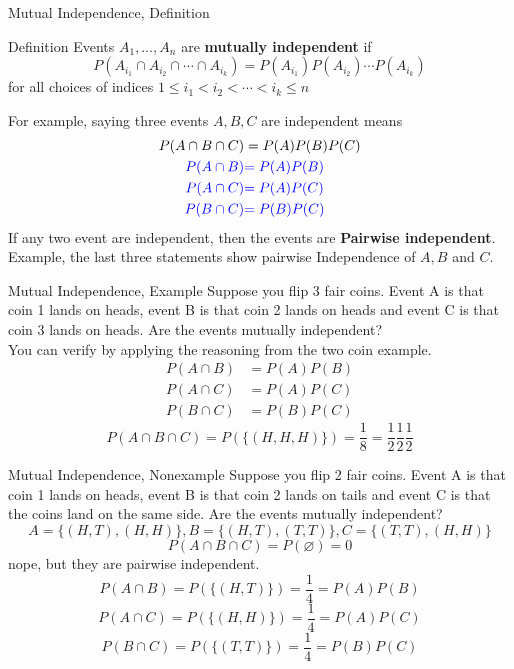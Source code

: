 \documentclass[handout]{beamer}
\newcommand{\blue}[1]{{\color{blue} #1}}
\newcommand{\nl}[1]{\vspace{#1 em}}
\let\emptyset\varnothing
\begin{document}
\begin{frame}{Mutual Independence, Definition}
    \begin{block}{Definition}
        Events $A_1,\dots,A_n$ are \textbf{mutually independent} if
        $$P(A_{i_1} \cap A_{i_2} \cap \cdots \cap A_{i_k}) = P(A_{i_1})P(A_{i_2})\cdots P(A_{i_k})$$
        for all choices of indices $1\leq i_1 < i_2 < \cdots < i_k \leq n$
    \end{block}
        \pause For example, saying three events $A, B, C$ are independent means 
        \begin{align*}
        P(A \cap B \cap C)&=P(A)P(B)P(C) \\
        \blue{P(A \cap B)}&\blue{=P(A)P(B)} \\
        \blue{P(A \cap C)}&\blue{=P(A)P(C)} \\
        \blue{P(B \cap C)}&\blue{=P(B)P(C)}
        \end{align*}
        \pause If any two event are independent, then the events are \textbf{Pairwise independent}. Example, the \blue{last three statements} show pairwise Independence of $A,B$ and $C$.
\end{frame}

\begin{frame}{Mutual Independence, Example}
    Suppose you flip 3 fair coins. Event A is that coin 1 lands on heads, event B is that coin 2 lands on heads and event C is that coin 3 lands on heads. Are the events mutually independent?
    \\ \nl{0.5}
    \pause You can verify by applying the reasoning from the two coin example.
\begin{align*}
    P(A \cap B)&=P(A)P(B) \\
    P(A \cap C)&=P(A)P(C)\\
    P(B \cap C)&=P(B)P(C)
\end{align*}
    \pause \[P(A\cap B\cap C) = P(\{  (H,H,H)\}) = \frac{1}{8} = \frac{1}{2} \frac{1}{2} \frac{1}{2}\]
\end{frame}

\begin{frame}{Mutual Independence, Nonexample}
    Suppose you flip 2 fair coins. Event A is that coin 1 lands on heads, event B is that coin 2 lands on tails and event C is that the coins land on the same side. Are the events mutually independent?
    \\ \nl{0.5}
    \pause \[A = \{(H,T),(H,H)\}, B = \{(H,T),(T,T)\}, C = \{(T,T),(H,H)\}\]
    \[P(A\cap B \cap C) = P(\emptyset) = 0\]
    \pause nope, but they are pairwise independent.
    \pause \[P(A\cap B) = P(\{ (H,T) \}) = \frac{1}{4} = P(A) P(B)\]
    \[P(A\cap C) = P(\{ (H,H) \}) = \frac{1}{4} = P(A) P(C)\]
    \[P(B\cap C) = P(\{ (T,T) \}) = \frac{1}{4} = P(B) P(C)\]
\end{frame}
\end{document}
